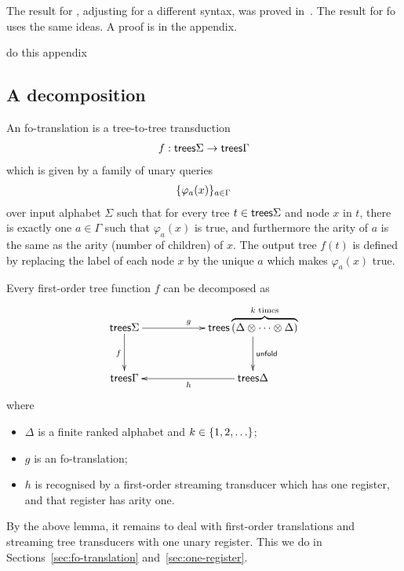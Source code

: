 The result for \mso, adjusting for a different syntax,  was proved in~\cite[Theorem 4.6]{alur2017streaming}. The result for fo uses the same ideas. A proof is in the appendix.
\begin{center}
    do this appendix 
\end{center}

\subsection{A decomposition}


\begin{definition}[Fo translation]
    An fo-translation is a tree-to-tree transduction
    \begin{align*}
      f :   \mathsf {trees} \Sigma \to \mathsf {trees} \Gamma
    \end{align*}
    which is given by a family of unary queries 
    \begin{align*}
        \{\varphi_a(x)\}_{a \in \Gamma}
    \end{align*}
    over input alphabet $\Sigma$ such that for every tree $t \in \mathsf {trees} \Sigma$ and node $x$ in $t$, there is exactly one $a \in \Gamma$ such that $\varphi_a(x)$ is true, and furthermore the arity of $a$ is the same as the arity (number of children) of $x$.  The output tree $f(t)$ is defined by replacing the label of each node $x$ by the unique $a$ which makes $\varphi_a(x)$ true.
\end{definition}



\begin{lemma}\label{lem:decomposition-of-fo-transductions} Every first-order tree function $f$  can be decomposed as
    \begin{align*}
        \xymatrix@C=2cm{\treesz \Sigma \ar[d]_f \ar[r]^g& \treesz \overbrace{(\Delta \otimes \cdots \otimes \Delta)}^{\text{$k$ times}} \ar[d]^{\mathsf{unfold}} \\   \treesz \Gamma  & \treesz \Delta \ar[l]^h}
    \end{align*}
    where 
    \begin{itemize}
        \item $\Delta$ is a finite ranked alphabet and $k \in \{1,2,\ldots\}$;
        \item $g$ is an fo-translation;
        \item $h$ is recognised by a first-order streaming transducer which has one register, and that register has arity one.
    \end{itemize}
\end{lemma}

By the above lemma, it remains to deal with first-order translations and streaming tree transducers with one unary register. This we do in Sections~\ref{sec:fo-translation} and~\ref{sec:one-register}.

